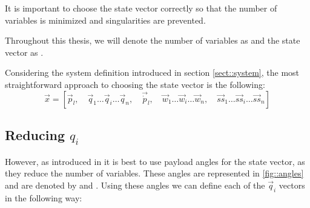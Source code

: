 It is important to choose the state vector correctly so that the number of variables is minimized and singularities are prevented. 

Throughout this thesis, we will denote the number of variables as  and the state vector as .

Considering the system definition introduced in section \ref{sect::system}, the most straightforward approach to choosing the state vector is the following:
\begin{equation}
\vec{x}=
[\vec p_l ,\quad
 \vec q_1 \dots \vec q_i \dots \vec q_n ,\quad
 \vec{\dot{p}}_l ,\quad
 \vec w_1 \dots \vec w_i \dots \vec w_n ,\quad
 \vec{ss}_1 \dots \vec{ss}_i \dots \vec{ss}_n
]
\label{eq::state_naive}
\end{equation}

\subsection{Reducing $q_i$}
However, as introduced in \cite{Potdar2018} it is best to use payload angles for the state vector, as they reduce the number of variables. These angles are represented in \cref{fig::angles} and are denoted by  and . Using these angles we can define each of the $\vec q_i$ vectors in the following way:

